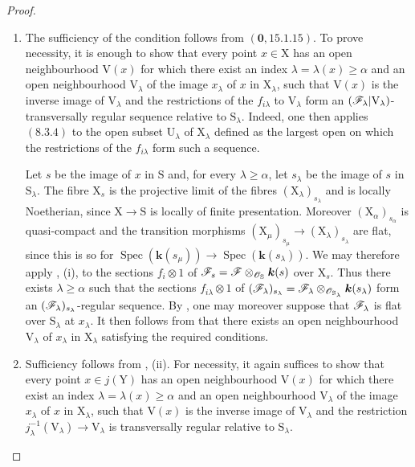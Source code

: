 \begin{proof}
\begin{enumerate}
\item[\rm(i)]
The sufficiency of the condition follows from $(\mathbf{0},15.1.15)$. To prove necessity, it is enough to show that every point $x\in\mathrm{X}$ has an open neighbourhood $\mathrm{V}(x)$ for which there exist an index $\lambda=\lambda(x)\geqslant\alpha$ and an open neighbourhood $\mathrm{V}_\lambda$ of the image $x_\lambda$ of $x$ in $\mathrm{X}_\lambda$, such that $\mathrm{V}(x)$ is the inverse image of $\mathrm{V}_\lambda$ and the restrictions of the $f_{i\lambda}$ to $\mathrm{V}_\lambda$ form an $(\mathscr{F}_\lambda|\mathrm{V}_\lambda)$-transversally regular sequence relative to $\mathrm{S}_\lambda$. Indeed, one then applies $(8.3.4)$ to the open subset $\mathrm{U}_\lambda$ of $\mathrm{X}_\lambda$ defined as the largest open on which the restrictions of the $f_{i\lambda}$ form such a sequence.

Let $s$ be the image of $x$ in $\mathrm{S}$ and, for every $\lambda\geqslant\alpha$, let $s_\lambda$ be the image of $s$ in $\mathrm{S}_\lambda$. The fibre $\mathrm{X}_s$ is the projective limit of the fibres $(\mathrm{X}_\lambda)_{s_\lambda}$ and is locally Noetherian, since $\mathrm{X}\to\mathrm{S}$ is locally of finite presentation. Moreover $(\mathrm{X}_\alpha)_{s_\alpha}$ is quasi-compact and the transition morphisms $(\mathrm{X}_\mu)_{s_\mu}\to(\mathrm{X}_\lambda)_{s_\lambda}$ are flat, since this is so for $\operatorname{Spec}(\boldsymbol{k}(s_\mu))\to\operatorname{Spec}(\boldsymbol{k}(s_\lambda))$. We may therefore apply , (i), to the sections $f_i\otimes1$ of $\mathscr{F}_s=\mathscr{F}\otimes_{\mathscr{O}_\mathrm{S}}\boldsymbol{k}(s)$ over $\mathrm{X}_s$. Thus there exists $\lambda\geqslant\alpha$ such that the sections $f_{i\lambda}\otimes1$ of $(\mathscr{F}_\lambda)_{s_\lambda}=\mathscr{F}_\lambda\otimes_{\mathscr{O}_{\mathrm{S}_\lambda}}\boldsymbol{k}(s_\lambda)$ form an $(\mathscr{F}_\lambda)_{s_\lambda}$-regular sequence. By , one may moreover suppose that $\mathscr{F}_\lambda$ is flat over $\mathrm{S}_\lambda$ at $x_\lambda$. It then follows from  that there exists an open neighbourhood $\mathrm{V}_\lambda$ of $x_\lambda$ in $\mathrm{X}_\lambda$ satisfying the required conditions.

\item[\rm(ii)] Sufficiency follows from , (ii). For necessity, it again suffices to show that every point $x\in j(\mathrm{Y})$ has an open neighbourhood $\mathrm{V}(x)$ for which there exist an index $\lambda=\lambda(x)\geqslant\alpha$ and an open neighbourhood $\mathrm{V}_\lambda$ of the image $x_\lambda$ of $x$ in $\mathrm{X}_\lambda$, such that $\mathrm{V}(x)$ is the inverse image of $\mathrm{V}_\lambda$ and the restriction $j_\lambda^{-1}(\mathrm{V}_\lambda)\to\mathrm{V}_\lambda$ is transversally regular relative to $\mathrm{S}_\lambda$.


\end{enumerate}
\end{proof}
